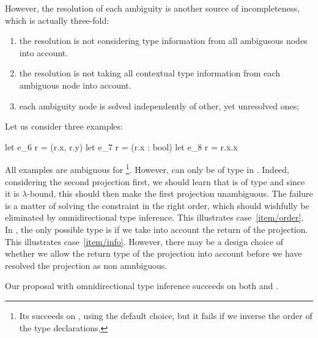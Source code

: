 \documentclass[acmsmall,screen,nonacm]{acmart}
\begin{document}
However, the resolution of each ambiguity is another source of
incompleteness, which is actually three-fold:
\begin{enumerate}
\item\label {item/order}
  the resolution is not considering type information from all ambigusous
  nodes into account.
\item\label {item/info}
  the resolution is not taking all contextual type information from
  each ambiguous node into account.
\item\label {item/simultaneous}
  each ambiguity node is solved independently of other, yet unresolved ones;
\end{enumerate}
Let us consider three examples:
\begin{program}[error]
let e_6 r = (r.x, r.y)
let e_7 r = (r.x : bool)
let e_8 r = r.x.x
\end{program}
All examples are ambiguous for \OCaml\footnote{Its succeeds on ,
using the default choice, but it fails if we inverse the order of the type
declarations.}.  However,  can only be of type
 in . Indeed, considering the second projection first,
we should learn that  is of type  and since it is
$\lambda$-bound, this should then make the first projection unambiguous.
The failure is a matter of solving the constraint in the right order, which
should wishfully be eliminated by omnidirectional type inference.
This illustrates case~\ref {item/order}.
%
In
, the only possible type is  if we take into account
the return of the projection. This illustrates case~\ref {item/info}.
However, there may be a design choice of whether we allow the return type of
the projection into account before we have resolved the projection as non
amnbiguous.

Our proposal with omnidirectional type inference succeeds
on both  and .
\end{document}
